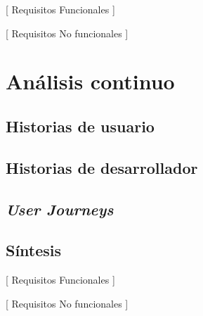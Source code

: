 [ Requisitos Funcionales ]

[ Requisitos No funcionales ]

\section{Análisis continuo}

\subsection{Historias de usuario}

\subsection{Historias de desarrollador}

\subsection{\textit{User Journeys}}

\subsection{Síntesis}

[ Requisitos Funcionales ]

[ Requisitos No funcionales ]
